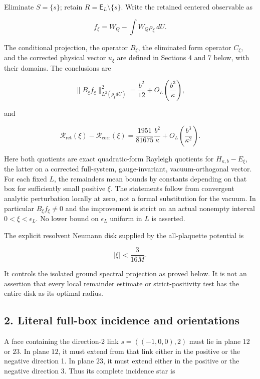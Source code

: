 Eliminate \(S=\{s\}\); retain \(R=\mathsf E_L\setminus\{s\}\). Write the
retained centered observable as

\[
f_\xi=W_Q-\int W_Q\rho_\xi\,dU.
\tag{1.8}
\]

The conditional projection, the operator \(B_\xi\), the eliminated form
operator \(C_\xi\), and the corrected physical vector \(u_\xi\) are
defined in Sections 4 and 7 below, with their domains. The conclusions
are

\[
\boxed{\|B_\xi f_\xi\|_{L^2(\rho_\xi dU)}^2
=\frac{b^2}{12}+O_L\!\left(\frac{b^3}{\kappa}\right),}
\tag{1.9}
\]

and

\[
\boxed{\mathcal R_{\mathrm{ret}}(\xi)-\mathcal R_{\mathrm{corr}}(\xi)
=\frac{1951}{81675}\frac{b^2}{\kappa}
 +O_L\!\left(\frac{b^3}{\kappa^2}\right).}
\tag{1.10}
\]

Here both quotients are exact quadratic-form Rayleigh quotients for
\(H_{\kappa,b}-E_\xi\), the latter on a corrected full-system,
gauge-invariant, vacuum-orthogonal vector. For each fixed \(L\), the
remainders mean bounds by constants depending on that box for
sufficiently small positive \(\xi\). The statements follow from
convergent analytic perturbation locally at zero, not a formal
substitution for the vacuum. In particular \(B_\xi f_\xi\ne0\) and the
improvement is strict on an actual nonempty interval
\(0<\xi<\epsilon_L\). No lower bound on \(\epsilon_L\) uniform in \(L\)
is asserted.

The explicit resolvent Neumann disk supplied by the all-plaquette
potential is

\[
\boxed{|\xi|<\frac{3}{16M}.}
\tag{1.11}
\]

It controls the isolated ground spectral projection as proved below. It
is not an assertion that every local remainder estimate or
strict-positivity test has the entire disk as its optimal radius.

\subsection{2. Literal full-box incidence and
orientations}\label{bulk-literal-full-box-incidence-and-orientations}

A face containing the direction-2 link \(s=((-1,0,0),2)\) must lie in
plane \(12\) or \(23\). In plane \(12\), it must extend from that link
either in the positive or the negative direction 1. In plane \(23\), it
must extend either in the positive or the negative direction 3. Thus its
complete incidence star is

